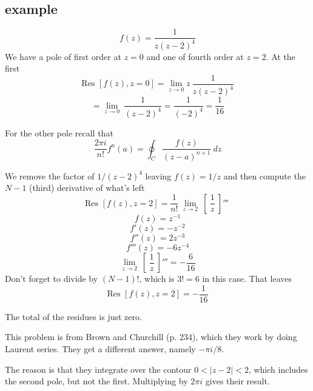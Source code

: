 \documentclass[11pt, oneside]{article}
\begin{document}
\subsection*{example}
\[ f(z) = \frac{1}{z(z-2)^4} \]
We have a pole of first order at $z=0$ and one of fourth order at $z=2$.  At the first
\[ \text{Res } [f(z),z=0] = \lim_{z \rightarrow 0}  z \ \frac{1}{z(z-2)^4} \]
\[ =  \lim_{z \rightarrow 0} \ \frac{1}{(z-2)^4}  = \frac{1}{(-2)^4} =  \frac{1}{16} \]

For the other pole recall that
\[ \frac{2 \pi i}{n!} f^n(a) = \oint_C \frac{f(z)}{(z-a)^{n+1}} \ dz \]

We remove the factor of $1/(z-2)^4$ leaving $f(z) = 1/z$ and then compute the $N-1$ (third) derivative of what's left
\[ \text{Res } [f(z),z=2] = \frac{1}{n!} \ \lim_{z \rightarrow 2} \ [ \ \frac{1}{z} \ ]''' \ \]
\[ f(z) = z^{-1} \]
\[ f'(z) = - z^{-2} \]
\[ f''(z) = 2 z^{-3} \]
\[ f'''(z) = -6 z^{-4} \]
\[  \lim_{z \rightarrow 2} \ [ \ \frac{1}{z} \ ]''' = - \frac{6}{16} \]
Don't forget to divide by $(N-1)!$, which is $3! = 6$ in this case.  That leaves
\[ \text{Res } [f(z),z=2] = - \frac{1}{16} \]

The total of the residues is just zero.  

This problem is from Brown and Churchill (p. 234), which they work by doing Laurent series.  They get a different answer, namely $-\pi i/8$.  

The reason is that they integrate over the contour $0 < | z - 2 | < 2$, which includes the second pole, but not the first.  Multiplying by $2 \pi i$ gives their result.
\end{document}

